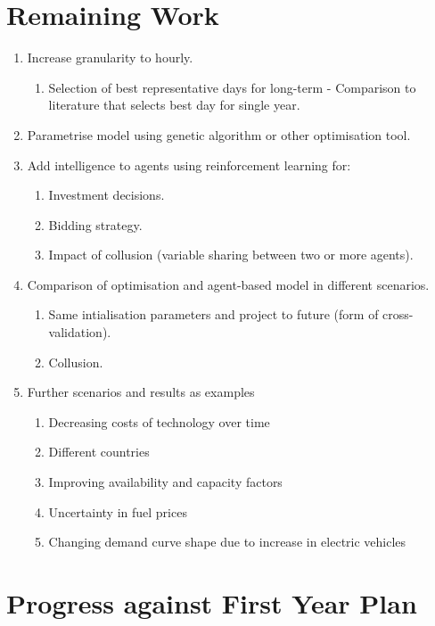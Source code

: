 \documentclass[12pt]{article}
\begin{document}
\section{Remaining Work}
\begin{enumerate}
  \item Increase granularity to hourly.
  \begin{enumerate}
  \item Selection of best representative days for long-term - Comparison to literature that selects best day for single year.
  \end{enumerate}
  \item  Parametrise model using genetic algorithm or other optimisation tool.

  \item Add intelligence to agents using reinforcement learning for:
  \begin{enumerate}
      \item Investment decisions.
      \item Bidding strategy.
      \item Impact of collusion (variable sharing between two or more agents).
  \end{enumerate}
  \item Comparison of optimisation and agent-based model in different scenarios.
  \begin{enumerate}
  \item Same intialisation parameters and project to future (form of cross-validation).
  \item Collusion.
  \end{enumerate}
  \item Further scenarios and results as examples
  \begin{enumerate}
  \item Decreasing costs of technology over time
  \item Different countries
  \item Improving availability and capacity factors
  \item Uncertainty in fuel prices
  \item Changing demand curve shape due to increase in electric vehicles
\end{enumerate}

\end{enumerate}




\clearpage

\section{Progress against First Year Plan}
\end{document}
